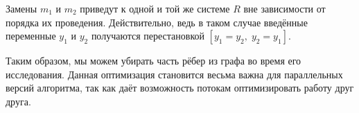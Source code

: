 \begin{proposition}
    Замены $m_1$ и $m_2$ приведут к одной и той же системе $R$ вне зависимости от порядка их проведения. Действительно, ведь в таком случае введённые переменные $y_1$ и $y_2$ получаются перестановкой $[y_1 = y_2,\; y_2 = y_1]$.
\end{proposition}

Таким образом, мы можем убирать часть рёбер из графа во время его исследования. Данная оптимизация становится весьма важна для параллельных версий алгоритма, так как даёт возможность потокам оптимизировать работу друг друга.